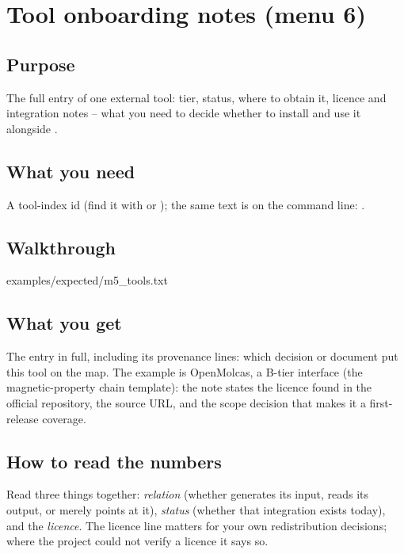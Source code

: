 \chapter{Tool onboarding notes (menu 6)}
\label{ch:menu6}

\section{Purpose}

The full entry of one external tool: tier, status, where to obtain it, licence
and integration notes -- what you need to decide whether to install and use it
alongside \fbk{}.

\section{What you need}

A tool-index id (find it with  or ); the same text is on
the command line: .

\section{Walkthrough}


  {examples/expected/m5_tools.txt}

\section{What you get}

The entry in full, including its provenance lines: which decision or document
put this tool on the map. The example is OpenMolcas, a B-tier interface
(the magnetic-property chain template): the note states the licence found in
the official repository, the source URL, and the scope decision that makes it
a first-release coverage.

\section{How to read the numbers}

\begin{readbox}
Read three things together: \emph{relation} (whether \fbk{} generates its
input, reads its output, or merely points at it), \emph{status} (whether that
integration exists today), and the \emph{licence}. The licence line matters for
your own redistribution decisions; where the project could not verify a licence
it says so.
\end{readbox}

